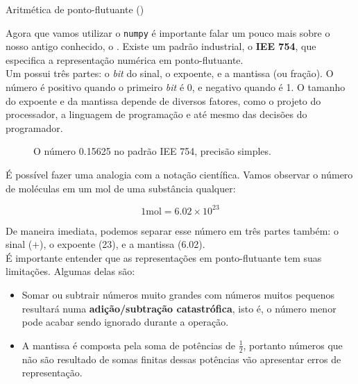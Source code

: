 \documentclass[12pt]{article}
\begin{document}


	\begin{interlude}{Aritmética de ponto-flutuante ()}
	
	Agora que vamos utilizar o \texttt{numpy} é importante falar um pouco mais sobre o nosso antigo conhecido, o . Existe um padrão industrial, o \textbf{IEE 754}, que especifica a representação numérica em ponto-flutuante.\\
	
	Um  possui três partes:	o \textit{bit} do sinal, o expoente, e a mantissa (ou fração). O número é positivo quando o primeiro \textit{bit} é 0, e negativo quando é 1. O tamanho do expoente e da mantissa depende de diversos fatores, como o projeto do processador, a linguagem de programação e até mesmo das decisões do programador.
	
	\begin{figure}[H]
	\centering
	\small
	  
	\caption{O número 0.15625 no padrão IEE 754, precisão simples.}
	\end{figure}
	
	É possível fazer uma analogia com a notação científica. Vamos observar o número de moléculas em um mol de uma substância qualquer:
	
		$$1 \text{mol} = 6.02 \times 10^{23}$$

	De maneira imediata, podemos separar esse número em três partes também: o sinal ($+$), o expoente (23), e a mantissa (6.02).\\
	
	É importante entender que as representações em ponto-flutuante tem suas limitações. Algumas delas são:
	
	\begin{itemize}
	\item Somar ou subtrair números muito grandes com números muitos pequenos resultará numa \textbf{adição/subtração catastrófica}, isto é, o número menor pode acabar sendo ignorado durante a operação.
	
	\item A mantissa é composta pela soma de potências de $\frac{1}{2}$, portanto números que não são resultado de somas finitas dessas potências vão apresentar erros de representação.
	\end{itemize}
	
	\end{interlude}
	
\end{document}
